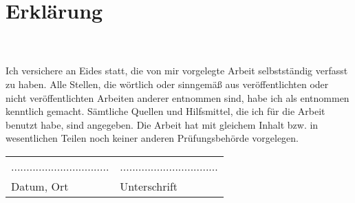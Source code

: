 \section*{Erklärung}
\ThesisAuthor \\
\ThesisAuthorAddress \\
\newline
Ich versichere an Eides statt, die von mir vorgelegte Arbeit selbstständig verfasst zu
haben. Alle Stellen, die wörtlich oder sinngemäß aus veröffentlichten oder 
nicht veröffentlichten Arbeiten anderer entnommen sind, habe ich als entnommen 
kenntlich gemacht. Sämtliche Quellen und Hilfsmittel, die ich für die Arbeit benutzt habe, 
sind angegeben. Die Arbeit hat mit gleichem Inhalt bzw. in wesentlichen Teilen noch keiner 
anderen Prüfungsbehörde vorgelegen.
\newline


\begin{tabular}{ll}
................................ & ................................ \\ 
Datum, Ort & Unterschrift
\end{tabular}
